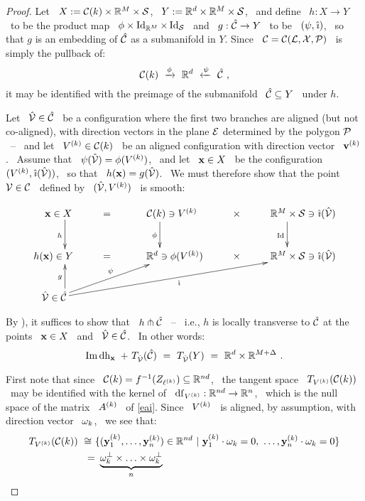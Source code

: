 \begin{proof}
Let \ $X:=\mathcal{C}(k)\times{\mathbb R}^{M}\times\mathcal{S}$, \
$Y:={\mathbb R}^{d}\times{\mathbb R}^{M}\times\mathcal{S}$, \ and define \
$h:X\to Y$ \ to be the product map \
$\phi\times\operatorname{Id}_{{\mathbb R}^{M}}\times\operatorname{Id}_{\mathcal{S}}$ \ and \
$g:\hat{\mathcal{C}}\to Y$ \ to be \ $(\psi,\hi)$, \ so that $g$ is an embedding of
$\hat{\mathcal{C}}$ as a submanifold in $Y$. Since \ $\mathcal{C}=\mathcal{C}(\mathcal{L},\mathcal{X},\mathcal{P})$ \ is
simply the pullback of:
$$
\mathcal{C}(k)~\xrightarrow{\phi}~{\mathbb R}^{d}~\xleftarrow{\psi}~\hat{\mathcal{C}}~,
$$
%
it may be identified with the preimage of the submanifold \
$\hat{\mathcal{C}}\subseteq Y$ \ under $h$\vsm.

Let \ $\hat{\mathcal{V}}\in\hat{\mathcal{C}}$ \ be a configuration where the first two branches
are aligned (but not co-aligned), with direction vectors in the plane
$\mathcal{E}$ determined by the polygon $\mathcal{P}$ \ -- \ and let \ $V\sp{({k})}\in\mathcal{C}(k)$ \ be an
aligned configuration  with direction vector \ $\mathbf{v}\sp{({k})}$. \ Assume
that \ $\psi(\hat{\mathcal{V}})=\phi(V\sp{({k})})$, \ and let \ $\mathbf{x}\in X$ \ be the
configuration \ $(\Vj{k},\hi(\hV))$, \ so that \ $h(\mathbf{x})=g(\hat{\mathcal{V}})$. \
We must therefore show that the point \ $\mathcal{V}\in\mathcal{C}$ \
defined by \ $(\hat{\mathcal{V}},V\sp{({k})})$ \ is smooth:

$$
\xymatrix@R=25pt{
\hspace*{3.5mm}\bx\in X\ar@<2.7ex>[d]_{h} & = &
\Ck\ar@<-2.8ex>[d]_{\phi}\ni\Vj{k} & \times &
\RR{M}\times\Sc\ar@<-3.7ex>[d]_{\Id}\ni\hi(\hV)\\
h(\bx)\in Y           & = & \hspace*{2mm}\RR{d}\ni\phi(\Vj{k})  & \times &
\RR{M}\times\Sc\ni\hi(\hV) \\
\hspace*{0.5mm}\hV\in\hC
\ar@<-2.7ex>[u]^{g}\ar[urr]^{\psi}\ar[urrrr]_{\hi} & & & &
}
$$

By \cite[I, Theorem 3.3]{Hi}), it suffices to show that \
$h\pitchfork\hat{\mathcal{C}}$  \ -- \ i.e., $h$ is locally transverse
to $\hat{\mathcal{C}}$ at the points \ $\mathbf{x}\in X$ \ and \ $\hat{\mathcal{V}}\in\hat{\mathcal{C}}$. \
In other words:
%
\begin{equation}\label{etransv}
%
\Image\dhh_{\bx}~+~T_{\hV}(\hC)~=~T_{\hV}(Y)~=~\RR{d}\times\RR{M+\Delta}~.
%
\end{equation}

First note that since \ $\mathcal{C}(k)=f^{-1}(Z_{\ell\sp{({k})}})\subseteq{\mathbb R}^{nd}$, \
the tangent space \ $T_{V\sp{({k})}}(\mathcal{C}(k))$ \ may be identified with the
kernel of \ $\operatorname{df}_{V\sp{({k})}}:{\mathbb R}^{nd}\to{\mathbb R}^{n}$, \ which
is the null space of the matrix \ $A\sp{({k})}$ \ of \eqref{eai}. Since \
$V\sp{({k})}$ \ is aligned, by assumption, with direction vector \
$\mathbf{\omega}_{k}$, \ we see that:
%
\begin{equation*}
%
\begin{split}
%
T_{\Vj{k}}(\Ck)~\cong~&
\{(\yj{k}_{1},\dotsc,\yj{k}_{n})\in\RR{nd}~|\
\yj{k}_{1}\cdot\oj{k}=0,\ \dotsc,
\yj{k}_{n}\cdot\oj{k}=0\}\\
=&~\underbrace{\oj{k}^{\perp}\times\dotsc\times\oj{k}^{\perp}}_{n}
%
\end{split}
%
\end{equation*}


\end{proof}
